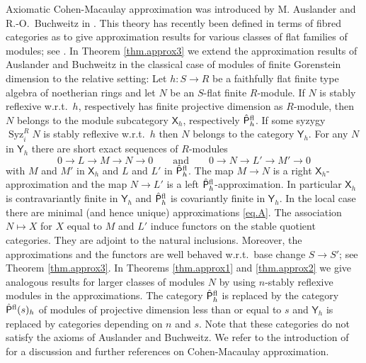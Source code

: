\documentclass[a4paper,10pt]{amsart}
\theoremstyle{plain}
\theoremstyle{definition}
\theoremstyle{remark}
\numberwithin{equation}{xx}
\DeclareMathOperator{\Syz}{Syz}
\newcommand{\co}{\colon}
\newcommand{\ra}{\rightarrow}
\newcommand{\lra}{\longrightarrow}
\newcommand{\Pf}{\hat{\cat{P}}{}^{\textnormal{fl}}}
\newcommand{\cat}[1]{\mathsf{{#1}}}
\newcommand{\syz}[2]{{\Syz}_{#2}^{#1}}
\begin{document}
Axiomatic Cohen-Macaulay approximation was introduced by M. Auslander and R.-O.\ Buchweitz in \cite{aus/buc:89}. This theory has recently been defined in terms of fibred categories as to give approximation results for various classes of flat families of modules; see \cite{ile:12a}.  
In Theorem \ref{thm.approx3} we extend the approximation results of Auslander and Buchweitz in the classical case of modules of finite Gorenstein dimension to the relative setting: Let \(h\co S\ra R\) be a faithfully flat finite type algebra of noetherian rings and let \(N\) be an \(S\)-flat finite \(R\)-module. If \(N\) is stably reflexive w.r.t.\ \(h\), respectively has finite projective dimension as \(R\)-module, then \(N\) belongs to the module subcategory \(\cat{X}_{h}\), respectively \(\Pf_{h}\). If some syzygy \(\syz{R}{i}N\) is stably reflexive w.r.t.\ \(h\) then \(N\) belongs to the category \(\cat{Y}_{h}\). For any \(N\) in \(\cat{Y}_{h}\) there are short exact sequences of \(R\)-modules
\begin{equation}\label{eq.A}
0\ra L\lra M\lra N\ra 0\qquad\text{and}\qquad 0\ra N\lra L'\lra M'\ra 0
\end{equation}
with \(M\) and \(M'\) in \(\cat{X}_{h}\) and \(L\) and \(L'\) in \(\Pf_{h}\). 
The map \(M\ra N\) is a right \(\cat{X}_{h}\)-approximation and the map \(N\ra L'\) is a left \(\Pf_{h}\)-approximation. In particular \(\cat{X}_{h}\) is contravariantly finite in \(\cat{Y}_{h}\) and \(\Pf_{h}\) is covariantly finite in \(\cat{Y}_{h}\). In the local case there are minimal (and hence unique) approximations \eqref{eq.A}. 
The association \(N\mapsto X\) for \(X\) equal to \(M\) and \(L'\) induce functors on the stable quotient categories. They are adjoint to the natural inclusions. Moreover, the approximations and the functors are well behaved w.r.t.\ base change \(S\ra S'\); see Theorem \ref{thm.approx3}. In Theorems \ref{thm.approx1} and \ref{thm.approx2} we give analogous results for larger classes of modules \(N\) by using \(n\)-stably reflexive modules in the approximations. The category \(\Pf_{h}\) is replaced by the category \(\Pf(s)_{h}\) of modules of projective dimension less than or equal to \(s\) and \(\cat{Y}_{h}\) is replaced by categories depending on \(n\) and \(s\). Note that these categories do not satisfy the axioms of Auslander and Buchweitz. We refer to the introduction of \cite{ile:12a} for a discussion and further references on Cohen-Macaulay approximation.
\end{document}
